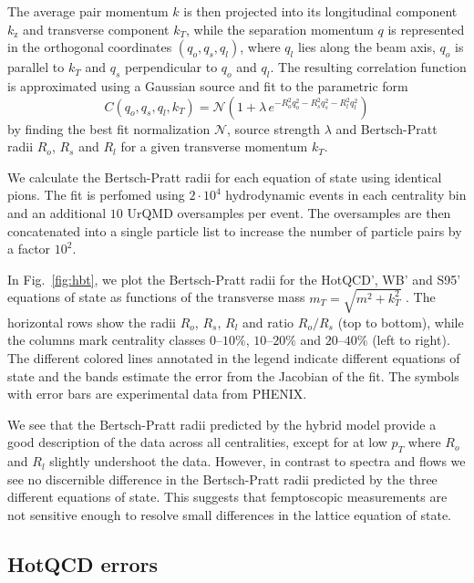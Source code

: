 \documentclass[aps,prc,reprint,amsmath,nofootinbib,superscriptaddress]{revtex4-1}
\begin{document}
The average pair momentum $k$ is then projected into its longitudinal component $k_\text{z}$ and transverse component $k_T$, while the separation momentum $q$ is represented in the orthogonal coordinates 
$(q_o, q_s, q_l)$, where $q_l$ lies along the beam axis, $q_o$ is parallel to $k_T$ and $q_s$ perpendicular to $q_o$ and $q_l$. The resulting correlation function is approximated using a Gaussian source and 
fit to the parametric form
\begin{equation}
 \label{fitfunction}
 C(q_o, q_s, q_l, k_T) = \mathcal{N} \left(1 + \lambda\, e^{-R_o^2 q_o^2 - R_s^2 q_s^2 - R_l^2 q_l^2} \right) 
\end{equation}
by finding the best fit normalization $\mathcal{N}$, source strength $\lambda$ and Bertsch-Pratt radii $R_o$, $R_s$ and $R_l$ for a given transverse momentum $k_T$. 

We calculate the Bertsch-Pratt radii for each equation of state using identical pions. The fit is perfomed using $2\cdot10^4$ hydrodynamic events in each centrality bin and an additional $10$ UrQMD oversamples per event. 
The oversamples are then concatenated into a single particle list to increase the number of particle pairs by a factor $10^2$.

In Fig.~\ref{fig:hbt}, we plot the Bertsch-Pratt radii for the HotQCD', WB' and S95' equations of state as functions of the transverse mass $m_T = \sqrt{m^2 + k_T^2}$ . The horizontal rows show the radii $R_o$, $R_s$, $R_l$ and ratio $R_o/R_s$ (top to bottom), while the columns 
mark centrality classes $0$--$10\%$, $10$--$20\%$ and $20$--$40\%$ (left to right). The different colored lines annotated in the legend indicate different equations of state and the bands estimate the error from the Jacobian 
of the fit. The symbols with error bars are experimental data from PHENIX.

We see that the Bertsch-Pratt radii predicted by the hybrid model provide a good description of the data across all centralities, except for at low $p_T$ where $R_o$ and $R_l$ slightly undershoot the data. However, in contrast to
spectra and flows we see no discernible difference in the Bertsch-Pratt radii predicted by the three different equations of state. This suggests that femptoscopic measurements are not sensitive enough to resolve small differences
in the lattice equation of state.
 
\subsection{HotQCD errors}
\label{errors}
\end{document}
